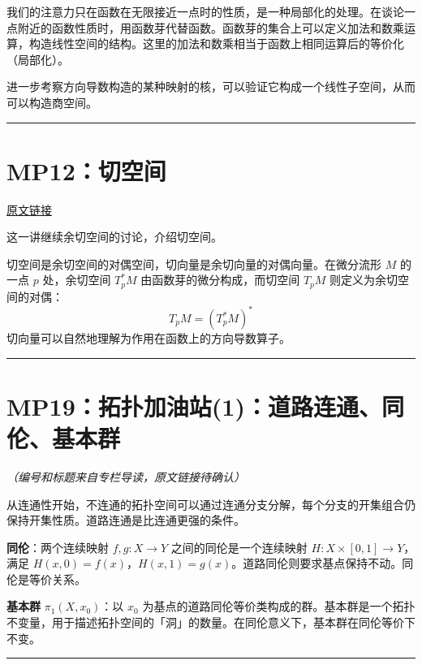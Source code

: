 \documentclass[10pt, openany]{book}
\begin{document}
我们的注意力只在函数在无限接近一点时的性质，是一种局部化的处理。在谈论一点附近的函数性质时，用函数芽代替函数。函数芽的集合上可以定义加法和数乘运算，构造线性空间的结构。这里的加法和数乘相当于函数上相同运算后的等价化（局部化）。

进一步考察方向导数构造的某种映射的核，可以验证它构成一个线性子空间，从而可以构造商空间。

\medskip
\noindent\rule{\textwidth}{0.4pt}

\section{MP12：切空间}
\label{sec:mp12}

\href{https://zhuanlan.zhihu.com/p/44211005}{原文链接}

这一讲继续余切空间的讨论，介绍切空间。

切空间是余切空间的对偶空间，切向量是余切向量的对偶向量。在微分流形 $M$ 的一点 $p$ 处，余切空间 $T_p^*M$ 由函数芽的微分构成，而切空间 $T_pM$ 则定义为余切空间的对偶：
\[
T_pM = (T_p^*M)^*
\]
切向量可以自然地理解为作用在函数上的方向导数算子。

\medskip
\noindent\rule{\textwidth}{0.4pt}

\section{MP19：拓扑加油站(1)：道路连通、同伦、基本群}
\label{sec:mp19}

\textit{（编号和标题来自专栏导读，原文链接待确认）}

从连通性开始，不连通的拓扑空间可以通过连通分支分解，每个分支的开集组合仍保持开集性质。道路连通是比连通更强的条件。

\textbf{同伦}：两个连续映射 $f, g: X \to Y$ 之间的同伦是一个连续映射 $H: X \times [0,1] \to Y$，满足 $H(x,0) = f(x)$，$H(x,1) = g(x)$。道路同伦则要求基点保持不动。同伦是等价关系。

\textbf{基本群} $\pi_1(X, x_0)$：以 $x_0$ 为基点的道路同伦等价类构成的群。基本群是一个拓扑不变量，用于描述拓扑空间的「洞」的数量。在同伦意义下，基本群在同伦等价下不变。

\medskip
\noindent\rule{\textwidth}{0.4pt}



%
%
\printbibliography
\end{document}
